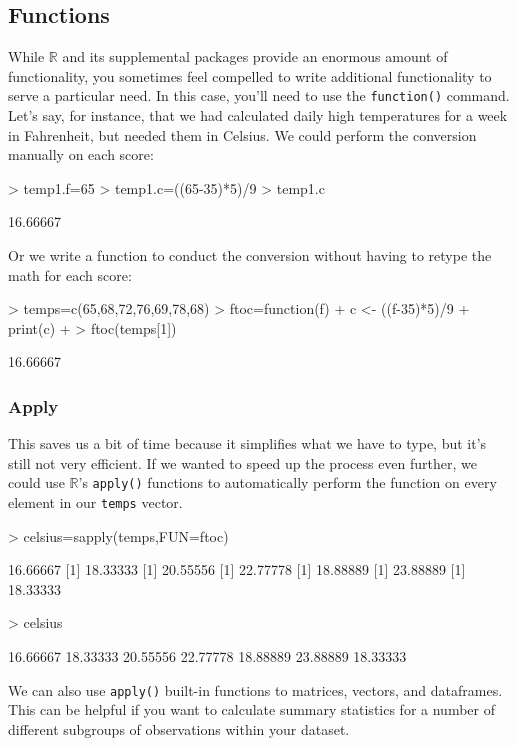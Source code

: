 \documentclass[12pt]{article}
\begin{document}
\subsection{Functions}
While $\mathbb{R}$ and its supplemental packages provide an enormous amount of functionality, you sometimes feel compelled to write additional functionality to serve a particular need. In this case, you'll need to use the \verb|function()| command. Let's say, for instance, that we had calculated daily high temperatures for a week in Fahrenheit, but needed them in Celsius. We could perform the conversion manually on each score:
\begin{Schunk}
\begin{Sinput}
> temp1.f=65
> temp1.c=((65-35)*5)/9
> temp1.c
\end{Sinput}
\begin{Soutput}
[1] 16.66667
\end{Soutput}
\end{Schunk}

Or we write a function to conduct the conversion without having to retype the math for each score:
\begin{Schunk}
\begin{Sinput}
> temps=c(65,68,72,76,69,78,68)
> ftoc=function(f) {
+ 	c <- ((f-35)*5)/9
+ 	print(c)
+ }
> ftoc(temps[1])
\end{Sinput}
\begin{Soutput}
[1] 16.66667
\end{Soutput}
\end{Schunk}

\subsubsection{Apply}
This saves us a bit of time because it simplifies what we have to type, but it's still not very efficient. If we wanted to speed up the process even further, we could use $\mathbb{R}$'s \verb|apply()| functions to automatically perform the function on every element in our \verb|temps| vector.
\begin{Schunk}
\begin{Sinput}
> celsius=sapply(temps,FUN=ftoc)
\end{Sinput}
\begin{Soutput}
[1] 16.66667
[1] 18.33333
[1] 20.55556
[1] 22.77778
[1] 18.88889
[1] 23.88889
[1] 18.33333
\end{Soutput}
\begin{Sinput}
> celsius
\end{Sinput}
\begin{Soutput}
[1] 16.66667 18.33333 20.55556 22.77778 18.88889 23.88889 18.33333
\end{Soutput}
\end{Schunk}
We can also use \verb|apply()| built-in functions to matrices, vectors, and dataframes. This can be helpful if you want to calculate summary statistics for a number of different subgroups of observations within your dataset.
\end{document}
